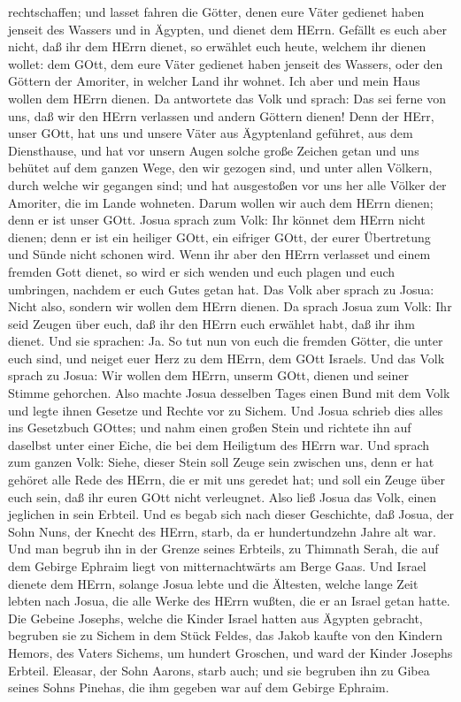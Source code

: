 rechtschaffen; und lasset fahren die Götter, denen eure Väter gedienet
haben jenseit des Wassers und in Ägypten, und dienet dem HErrn.
 Gefällt es euch aber nicht, daß ihr dem HErrn dienet, so
erwählet euch heute, welchem ihr dienen wollet: dem GOtt, dem eure Väter
gedienet haben jenseit des Wassers, oder den Göttern der Amoriter, in
welcher Land ihr wohnet. Ich aber und mein Haus wollen dem HErrn dienen.
 Da antwortete das Volk und sprach: Das sei ferne von uns,
daß wir den HErrn verlassen und andern Göttern dienen! 
Denn der HErr, unser GOtt, hat uns und unsere Väter aus Ägyptenland
geführet, aus dem Diensthause, und hat vor unsern Augen solche große
Zeichen getan und uns behütet auf dem ganzen Wege, den wir gezogen sind,
und unter allen Völkern, durch welche wir gegangen sind; 
und hat ausgestoßen vor uns her alle Völker der Amoriter, die im Lande
wohneten. Darum wollen wir auch dem HErrn dienen; denn er ist unser
GOtt.  Josua sprach zum Volk: Ihr könnet dem HErrn nicht
dienen; denn er ist ein heiliger GOtt, ein eifriger GOtt, der eurer
Übertretung und Sünde nicht schonen wird.  Wenn ihr aber
den HErrn verlasset und einem fremden Gott dienet, so wird er sich
wenden und euch plagen und euch umbringen, nachdem er euch Gutes getan
hat.  Das Volk aber sprach zu Josua: Nicht also, sondern
wir wollen dem HErrn dienen.  Da sprach Josua zum Volk: Ihr
seid Zeugen über euch, daß ihr den HErrn euch erwählet habt, daß ihr ihm
dienet. Und sie sprachen: Ja.  So tut nun von euch die
fremden Götter, die unter euch sind, und neiget euer Herz zu dem HErrn,
dem GOtt Israels.  Und das Volk sprach zu Josua: Wir wollen
dem HErrn, unserm GOtt, dienen und seiner Stimme gehorchen.
 Also machte Josua desselben Tages einen Bund mit dem Volk
und legte ihnen Gesetze und Rechte vor zu Sichem.  Und
Josua schrieb dies alles ins Gesetzbuch GOttes; und nahm einen großen
Stein und richtete ihn auf daselbst unter einer Eiche, die bei dem
Heiligtum des HErrn war.  Und sprach zum ganzen Volk:
Siehe, dieser Stein soll Zeuge sein zwischen uns, denn er hat gehöret
alle Rede des HErrn, die er mit uns geredet hat; und soll ein Zeuge über
euch sein, daß ihr euren GOtt nicht verleugnet.  Also ließ
Josua das Volk, einen jeglichen in sein Erbteil.  Und es
begab sich nach dieser Geschichte, daß Josua, der Sohn Nuns, der Knecht
des HErrn, starb, da er hundertundzehn Jahre alt war.  Und
man begrub ihn in der Grenze seines Erbteils, zu Thimnath Serah, die auf
dem Gebirge Ephraim liegt von mitternachtwärts am Berge Gaas.
 Und Israel dienete dem HErrn, solange Josua lebte und die
Ältesten, welche lange Zeit lebten nach Josua, die alle Werke des HErrn
wußten, die er an Israel getan hatte.  Die Gebeine Josephs,
welche die Kinder Israel hatten aus Ägypten gebracht, begruben sie zu
Sichem in dem Stück Feldes, das Jakob kaufte von den Kindern Hemors, des
Vaters Sichems, um hundert Groschen, und ward der Kinder Josephs
Erbteil.  Eleasar, der Sohn Aarons, starb auch; und sie
begruben ihn zu Gibea seines Sohns Pinehas, die ihm gegeben war auf dem
Gebirge Ephraim.

